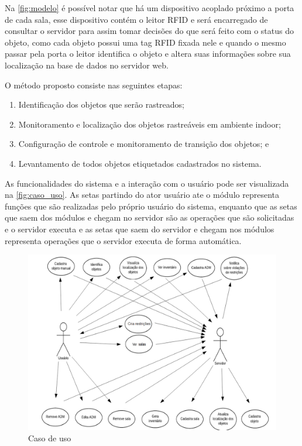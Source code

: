 \par
Na \autoref{fig:modelo} é possível notar que há um dispositivo acoplado próximo a
porta de cada sala, esse dispositivo contém o leitor RFID e será encarregado de consultar o
servidor para assim tomar decisões do que será feito com o status do objeto, como cada objeto possui uma tag RFID fixada
nele e quando o mesmo passar pela porta o leitor identifica o objeto e altera suas informações sobre sua localização na base de dados no servidor web.

\par
O método proposto consiste nas seguintes etapas:
\begin{enumerate}
    \item Identificação dos objetos que serão rastreados;
    \item Monitoramento e localização dos objetos rastreáveis em ambiente indoor; 
    \item Configuração de controle e monitoramento de transição dos objetos; e
    \item Levantamento de todos objetos etiquetados cadastrados no sistema.
\end{enumerate}

\par
As funcionalidades do sistema e a interação com o usuário pode ser visualizada na \autoref{fig:caso_uso}. As setas partindo do ator usuário ate o módulo representa funções que são realizadas pelo próprio usuário do sistema, enquanto que as setas que saem dos módulos e chegam no servidor são as operações que são solicitadas e o servidor executa e as setas que saem do servidor e chegam nos módulos representa operações que o servidor executa de forma automática.
\begin{figure}[H]
              \caption{\label{fig:caso_uso}{Caso de uso}}
              \centering
              \includegraphics[width=1.1\textwidth]{Figuras/caso_de_uso.png}
        \end{figure}
%
%
